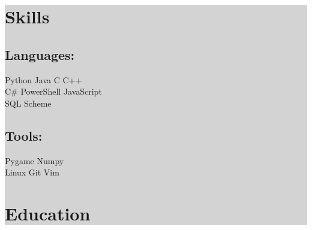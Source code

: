 \documentclass[letterpaper]{kevin-resume} %
\begin{document}
\colorbox{lightgray}{\begin{minipage}[t]{0.30\textwidth} %


\section{Skills}

\subsection{Languages:}
Python \textbullet{}
Java \textbullet{}
C \textbullet{} 
C++ \\
C\# \textbullet{}
PowerShell \textbullet{}
JavaScript \\
SQL \textbullet{} 
Scheme

\sectionspace %

\subsection{Tools:}
Pygame \textbullet{}
Numpy \\
Linux \textbullet{}
Git \textbullet{}
Vim

\sectionspace %






\section{Education} 


\end{minipage}}
\end{document}
